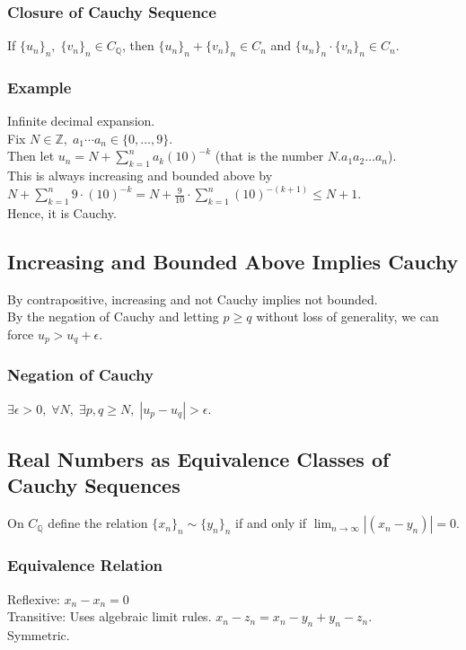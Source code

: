 \documentclass[11pt]{article}
\newcommand{\0}{\emptyset}
\newcommand{\Z}{\mathbb{Z}}
\newcommand{\Q}{\mathbb{Q}}
\begin{document}
\subsubsection*{Closure of Cauchy Sequence}
\label{sec:orgad6f3e5}
If \(\{u_{n}\}_{n},\;\{v_{n}\}_{n}\in C_{\Q}\), then \(\{u_{n}\}_{n}+\{v_{n}\}_{n}\in C_{n}\) and \(\{u_{n}\}_{n}\cdot\{v_{n}\}_{n}\in C_{n}\).\\[0pt]
\subsubsection*{Example}
\label{sec:orgcdb51a1}
Infinite decimal expansion.\\[0pt]
Fix \(N\in\Z,\; a_{1}\cdots a_{n}\in\{0,\ldots,9\}\).\\[0pt]
Then let \(u_{n}=N+\sum_{k=1}^{n}a_{k}(10)^{-k}\) (that is the number \(N.a_{1}a_{2}\ldots a_{n}\)).\\[0pt]
This is always increasing and bounded above by \(N+\sum_{k=1}^{n}9\cdot(10)^{-k}=N+\frac{9}{10}\cdot\sum_{k=1}^{n}(10)^{-(k+1)}\leq N+1\).\\[0pt]
Hence, it is Cauchy.\\[0pt]
\subsection*{Increasing and Bounded Above Implies Cauchy}
\label{sec:org1141640}
By contrapositive, increasing and not Cauchy implies not bounded.\\[0pt]
By the negation of Cauchy and letting \(p\geq q\) without loss of generality, we can force \(u_{p}> u_{q}+\epsilon\).\\[0pt]
\subsubsection*{Negation of Cauchy}
\label{sec:orgf8f6e07}
\(\exists\epsilon>0,\;\forall N,\;\exists p,q\geq N,\;|u_{p}-u_{q}|>\epsilon\).\\[0pt]
\subsection*{Real Numbers as Equivalence Classes of Cauchy Sequences}
\label{sec:org09002e5}
On \(C_{\Q}\) define the relation \(\{x_{n}\}_{n}\sim\{y_{n}\}_{n}\) if and only if \(\lim_{n\to\infty}|(x_{n}-y_{n})|=0\).\\[0pt]
\subsubsection*{Equivalence Relation}
\label{sec:org9010328}
Reflexive: \(x_{n}-x_{n}=0\)\\[0pt]
Transitive: Uses algebraic limit rules. \(x_{n}-z_{n}=x_{n}-y_{n}+y_{n}-z_{n}\).\\[0pt]
Symmetric.\\[0pt]
\end{document}
